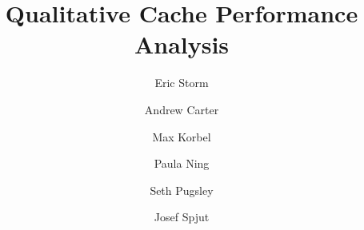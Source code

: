 \documentclass[pageno]{jpaper}
\begin{document}
\title{Qualitative Cache Performance Analysis}

\author{Eric Storm \and Andrew Carter \and Max Korbel \and Paula Ning \and Seth Pugsley \and Josef Spjut}
\date{}
\maketitle


\begin{abstract}

\end{abstract}











\end{document}
